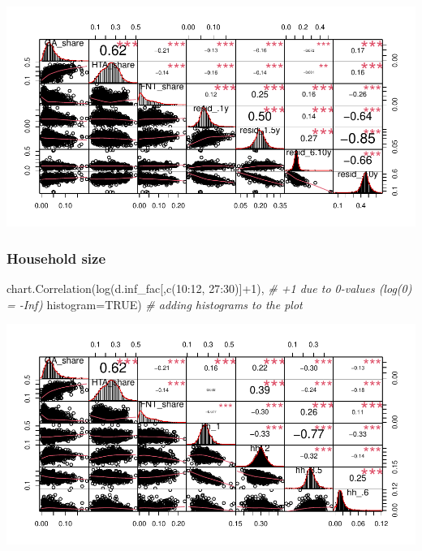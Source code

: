 \documentclass[
]{article}
\newenvironment{Shaded}{\begin{snugshade}}{\end{snugshade}}
\newcommand{\AttributeTok}[1]{\textcolor[rgb]{0.77,0.63,0.00}{#1}}
\newcommand{\CommentTok}[1]{\textcolor[rgb]{0.56,0.35,0.01}{\textit{#1}}}
\newcommand{\ConstantTok}[1]{\textcolor[rgb]{0.00,0.00,0.00}{#1}}
\newcommand{\DecValTok}[1]{\textcolor[rgb]{0.00,0.00,0.81}{#1}}
\newcommand{\FunctionTok}[1]{\textcolor[rgb]{0.00,0.00,0.00}{#1}}
\newcommand{\NormalTok}[1]{#1}
\newcommand{\SpecialCharTok}[1]{\textcolor[rgb]{0.00,0.00,0.00}{#1}}
\begin{document}
\includegraphics{Lin_Mod_Clus_Anal_files/figure-latex/unnamed-chunk-9-1.pdf}

\hypertarget{household-size}{%
\subsubsection{Household size}\label{household-size}}

\begin{Shaded}
\begin{Highlighting}[]
\FunctionTok{chart.Correlation}\NormalTok{(}\FunctionTok{log}\NormalTok{(d.inf\_fac[,}\FunctionTok{c}\NormalTok{(}\DecValTok{10}\SpecialCharTok{:}\DecValTok{12}\NormalTok{, }\DecValTok{27}\SpecialCharTok{:}\DecValTok{30}\NormalTok{)]}\SpecialCharTok{+}\DecValTok{1}\NormalTok{), }\CommentTok{\# +1 due to 0{-}values (log(0) = {-}Inf)}
                  \AttributeTok{histogram=}\ConstantTok{TRUE}\NormalTok{) }\CommentTok{\# adding histograms to the plot}
\end{Highlighting}
\end{Shaded}

\includegraphics{Lin_Mod_Clus_Anal_files/figure-latex/unnamed-chunk-10-1.pdf}
\end{document}
